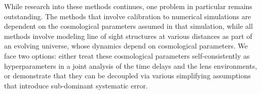 While research into these methods continues, one problem in particular
remains outstanding. The methods that involve calibration to numerical
simulations are dependent on the cosmological parameters assumed in that
simulation,  while all methods involve modeling line of sight structures
at various  distances as part of an evolving universe, whose dynamics
depend on cosmological parameters. We face two options: either treat
these cosmological parameters self-consistently  as hyperparameters in a
joint analysis of the time delays and the lens environments, or
demonstrate that they can be decoupled via various simplifying
assumptions that  introduce sub-dominant systematic error.
